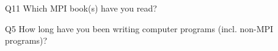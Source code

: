 \begin{description}%
\item{Q11} Which MPI book(s) have you read?%
\item{Q5} How long have you been writing computer programs (incl. non-MPI programs)?%
\end{description}%
